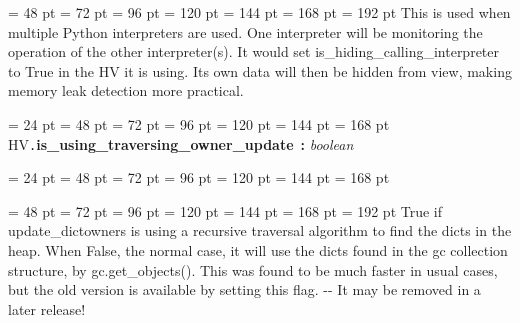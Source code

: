 {{{{\par \noindent  \leftskip = 48 pt  \leftmargini = 72 pt  \leftmarginii = 96 pt  \leftmarginiii = 120 pt  \leftmarginiv = 144 pt  \leftmarginv = 168 pt  \leftmarginvi = 192 pt This is used when multiple Python interpreters are used. One
interpreter will be monitoring the operation of the other
interpreter(s). It would set is{\_}hiding{\_}calling{\_}interpreter to True in
the HV it is using. Its own data will then be hidden from view, making
memory leak detection more practical.
\par}
\par}
\par}
{\par \noindent  \leftskip = 24 pt  \leftmargini = 48 pt  \leftmarginii = 72 pt  \leftmarginiii = 96 pt  \leftmarginiv = 120 pt  \leftmarginv = 144 pt  \leftmarginvi = 168 pt HV{\tt .\/}{\bf {\large {\bf is{\_}using{\_}traversing{\_}owner{\_}update\/}}\/}~{\bf :}  {\em boolean\/}\par}
{\par \noindent  \leftskip = 24 pt  \leftmargini = 48 pt  \leftmarginii = 72 pt  \leftmarginiii = 96 pt  \leftmarginiv = 120 pt  \leftmarginv = 144 pt  \leftmarginvi = 168 pt {\par \noindent
{\par \noindent  \leftskip = 48 pt  \leftmargini = 72 pt  \leftmarginii = 96 pt  \leftmarginiii = 120 pt  \leftmarginiv = 144 pt  \leftmarginv = 168 pt  \leftmarginvi = 192 pt 
True if update{\_}dictowners is using a recursive traversal algorithm to
find the dicts in the heap. When False, the normal case, it will use the
dicts found in the gc collection structure, by gc.get{\_}objects(). This was
found to be much faster in usual cases, but the old version is available
by setting this flag. -{}- It may be removed in a later release!

}}}}
